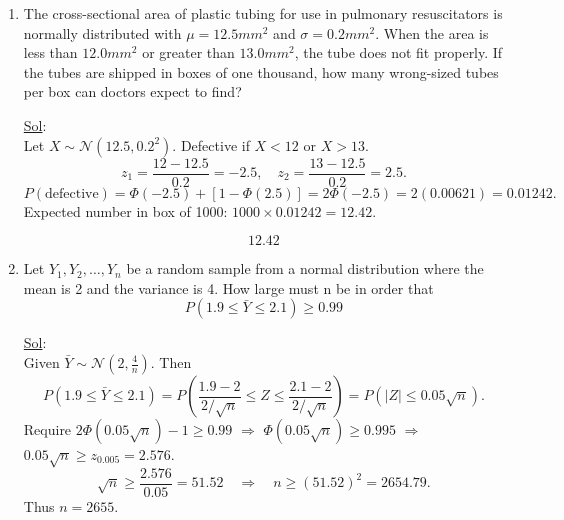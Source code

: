 \begin{enumerate}
\begin{enumerate}
		      \item Calculate the exact probability that \(13 \leq S \leq 14\).

		            \underline{Sol}: \\

		            \[
			            P(13 \le S \le 14) = e^{-12}\left(\frac{12^{13}}{13!} + \frac{12^{14}}{14!}\right) \approx 0.1056 + 0.0905 = \boxed{0.1961}.
		            \]
	      \end{enumerate}

	\item[26.] The cross-sectional area of plastic tubing for use in pulmonary resuscitators is normally distributed with \(\mu = 12.5 mm^2\) and \(\sigma = 0.2 mm^2\). When the area is less than \(12.0 mm^2\) or greater than \(13.0 mm^2\), the tube does not fit properly. If the tubes are shipped in boxes of one thousand, how many wrong-sized tubes per box can doctors expect to find?

	      \underline{Sol}: \\

	      Let \(X \sim \mathcal{N}(12.5, 0.2^2)\).
	      Defective if \(X < 12\) or \(X > 13\).
	      \[
		      z_1 = \frac{12 - 12.5}{0.2} = -2.5, \quad z_2 = \frac{13 - 12.5}{0.2} = 2.5.
	      \]
	      \[
		      P(\text{defective}) = \Phi(-2.5) + [1 - \Phi(2.5)] = 2\Phi(-2.5) = 2(0.00621) = 0.01242.
	      \]
	      Expected number in box of 1000: \(1000 \times 0.01242 = 12.42\).

	      \[
		      \boxed{12.42}
	      \]

	\item[34.] Let \(Y_1, Y_2, \dots,Y_n\) be a random sample from a normal distribution where the mean is 2 and the variance is 4. How large must n be in order that
	      \[
		      P(1.9 \leq \bar{Y} \leq 2.1) \geq 0.99
	      \]

	      \underline{Sol}: \\

	      Given \(\bar{Y} \sim \mathcal{N}\left(2, \frac{4}{n}\right)\). Then
	      \[
		      P(1.9 \le \bar{Y} \le 2.1) = P\left( \frac{1.9-2}{2/\sqrt{n}} \le Z \le \frac{2.1-2}{2/\sqrt{n}} \right) = P\left( |Z| \le 0.05\sqrt{n} \right).
	      \]
	      Require \(2\Phi(0.05\sqrt{n}) - 1 \ge 0.99\) \(\Rightarrow\) \(\Phi(0.05\sqrt{n}) \ge 0.995\) \(\Rightarrow\) \(0.05\sqrt{n} \ge z_{0.005} = 2.576\).
	      \[
		      \sqrt{n} \ge \frac{2.576}{0.05} = 51.52 \quad \Rightarrow \quad n \ge (51.52)^2 = 2654.79.
	      \]
	      Thus \(\boxed{n = 2655}\).


\end{enumerate}
